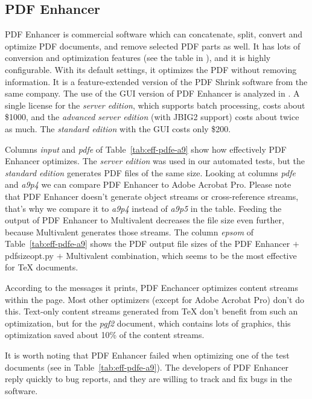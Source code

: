 \documentclass{ltugproc}
\def\cmd{\textsf}
\begin{document}
\subsection{PDF Enhancer}

PDF Enhancer \cite{pdfenhancer} is commercial software which can
concatenate, split, convert and optimize PDF documents, and remove selected
PDF parts as well. It has lots of conversion and optimization features (see
the table in \cite{pdfenhancer-features}), and it is highly configurable.
With its default settings, it optimizes the PDF without removing
information. It is a feature-extended version of the PDF Shrink software from
the same company. The use of the GUI version of PDF Enhancer is analyzed in
\cite{pdftweak}. A single license for the \emph{server edition}, which
supports batch processing, costs about \$1000, and the \emph{advanced server
edition} (with JBIG2 support) costs about twice as much. The
\emph{standard edition} with the GUI costs only \$200.

Columns \emph{input} and \emph{pdfe} of Table~\ref{tab:eff-pdfe-a9} show how
effectively PDF Enhancer optimizes. The \emph{server edition} was used in our
automated tests, but the \emph{standard edition} generates PDF files of the
same size. Looking at columns \emph{pdfe} and
\emph{a9p4} we can compare PDF Enhancer to Adobe Acrobat Pro. Please note that
PDF Enhancer doesn't generate object streams or cross-reference streams,
that's why we compare it to \emph{a9p4} instead of \emph{a9p5} in the table.
Feeding the output of PDF Enhancer to Multivalent decreases the file size
even further, because Multivalent generates those streams. The column
\emph{epsom} of Table~\ref{tab:eff-pdfe-a9} shows the PDF output file sizes
of the PDF Enhancer $+$ \cmd{pdfsizeopt.py} $+$ Multivalent combination, which
seems to be the most effective for \TeX{} documents.

According to the messages it prints, PDF Enchancer optimizes content streams
within the page. Most other optimizers (except for Adobe Acrobat Pro) don't do
this. Text-only content streams generated from \TeX{} don't benefit from
such an optimization, but for the \emph{pgf2} document, which contains lots of
graphics, this optimization saved about 10\% of the content streams.

It is worth noting that PDF Enhancer failed when optimizing one of the test
documents (see in Table~\ref{tab:eff-pdfe-a9}). The developers of PDF Enhancer
reply quickly to bug reports, and they are willing to track and fix bugs
in the software.
\end{document}
